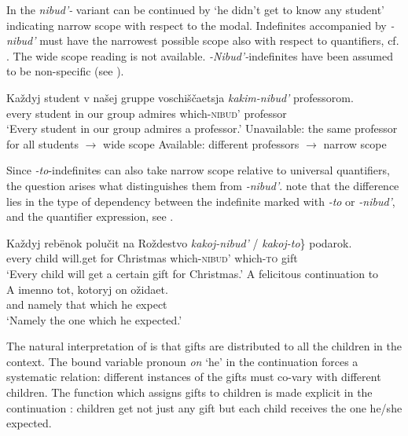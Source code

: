 \documentclass[output=paper,colorlinks,citecolor=brown]{langscibook}
\begin{document}

In  the \textit{nibud’-} variant can be continued by `he didn’t get to know any student' indicating narrow scope with respect to the modal. Indefinites accompanied by \textit{-nibud’} must have the narrowest possible scope also with respect to quantifiers, cf. . The wide scope reading is not available. \textit{-Nibud’-}indefinites have been assumed to be non-specific (see \citealt{Dahl1970}).

\ea\label{geist:ex:to-nibud2}
\gll Každyj student v našej gruppe voschiščaetsja \textit{kakim-nibud’}   professorom.\\
every student in our group admires which-\textsc{nibud'} professor\\
\glt ‘Every student in our group admires a professor.’
\ea Unavailable: the same professor for all students $\rightarrow$ wide scope
\ex Available: different professors $\rightarrow$ narrow scope
\z\z

\noindent Since \textit{-to}-indefinites can also take narrow scope relative to universal quantifiers, the question arises what distinguishes them from \textit{-nibud’}. \citet{Onea.Geist2011} note that the difference lies in the type of dependency between the indefinite marked with \textit{-to} or \textit{-nibud’}, and the quantifier expression, see .

\ea\label{geist:ex:to-nibud3}
\ea\label{geist:ex:to-nibud3a}
\gll Každyj	rebënok	polučit	na	Roždestvo \minsp{\{\#} \textit{kakoj-nibud’} / \textit{kakoj-to}\}	podarok.\\
every	child	will.get	for	Christmas {} which-\textsc{nibud'} {} which-\textsc{to} gift\\
\glt ‘Every child will get a certain gift for Christmas.’
\ex A felicitous continuation to \label{geist:ex:to-nibud3b}\\
\gll A imenno tot, kotoryj on ožidaet.\\
and namely that which he expect\\
\glt `Namely the one which he expected.'
\z\z

\noindent The natural interpretation of  is that gifts are distributed to all the children in the context. The bound variable pronoun \textit{on} ‘he’ in the continuation forces a systematic relation: different instances of the gifts must co-vary with different children. The function which assigns gifts to children is made explicit in the continuation  : children get not just any gift but each child receives the one he/she expected.
\end{document}
